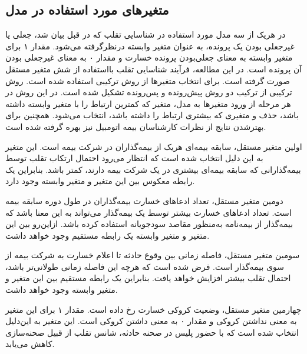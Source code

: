 \documentclass[paper=a4, fontsize=11pt]{article}
\numberwithin{equation}{section} %
\numberwithin{figure}{section} %
\numberwithin{table}{section} %
\begin{document}
\subsection{متغیر‌های مورد استفاده در مدل}
\par
در هریک از سه مدل مورد استفاده در شناسایی تقلب که در قبل بیان شد، جعلی یا غیرجعلی بودن یک پرونده، به عنوان متغیر وابسته درنظرگرفته می‌شود. مقدار ۱ برای متغیر وابسته به معنای جعلی‌بودن پرونده خسارت و مقدار ۰ به معنای غیرجعلی بودن آن پرونده است. در این مطالعه، فرآیند شناسایی تقلب با‌استفاده از شش متغیر مستقل صورت گرفته است. برای انتخاب متغیرها از روش ترکیبی استفاده شده است. روش ترکیبی از ترکیب دو روش پیش‌رونده و پس‌رونده تشکیل شده است. در این روش در هر مرحله از ورود متغیر‌ها به مدل، متغیر که کمترین ارتباط را با متغیر وابسته داشته باشد، حذف و متغیری که بیشتری ارتباط را داشته باشد، انتخاب می‌شود. همچنین برای بهتر‌شدن نتایج از نظرات کارشناسان بیمه اتومبیل نیز بهره گرفته شده است.
\par
اولین متغیر مستقل، سابقه بیمه‌ای هریک از بیمه‌گذاران در شرکت بیمه است. این متغیر به این دلیل انتخاب شده است که انتظار می‌رود احتمال ارتکاب تقلب توسط بیمه‌گذارانی که سابقه بیمه‌ای بیشتری در یک شرکت بیمه دارند، کمتر باشد.
بنابراین یک رابطه معکوس بین این متغیر و متغیر وابسته وجود دارد.
\par
دومین متغیر مستقل، تعداد ادعاهای خسارت بیمه‌گذاران در طول دوره سابقه بیمه است. تعداد ادعاهای خسارت بیشتر توسط یک بیمه‌گذار می‌تواند به این معنا باشد که بیمه‌گذار از بیمه‌نامه به‌منظور مقاصد سودجویانه استفاده کرده باشد. ازاین‌رو بین این متغیر و متغیر وابسته یک رابطه مستقیم وجود خواهد داشت.
\par
سومین متغیر مستقل، فاصله زمانی بین وقوع حادثه تا اعلام خسارت به شرکت بیمه از سوی بیمه‌گذار است. فرض شده است که هرچه این فاصله زمانی طولانی‌تر باشد، احتمال تقلب بیشتر افزایش خواهد یافت. بنابراین یک رابطه مستقیم بین این متغیر و متغیر وابسته وجود خواهد داشت.
\par
چهارمین متغیر مستقل، وضعیت کروکی خسارت رخ داده است. مقدار ۱ برای این متغیر به معنی نداشتن کروکی و مقدار ۰ به معنی داشتن کروکی است. این متغیر به این‌دلیل انتخاب شده است که با حضور پلیس در صحنه حادثه، شانس تقلب از قبیل صحنه‌سازی کاهش می‌یابد.
\end{document}
